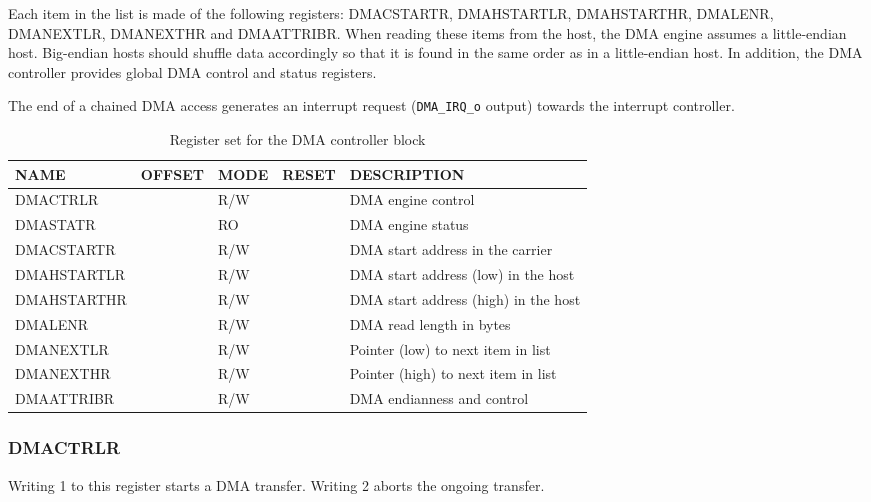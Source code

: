 \documentclass[10pt,a4paper]{cerndoc}
\begin{document}
Each item in the list is made of the following registers: DMACSTARTR, DMAHSTARTLR, DMAHSTARTHR, DMALENR, DMANEXTLR, DMANEXTHR and DMAATTRIBR. When reading these items from the host, the DMA engine assumes a little-endian host. Big-endian hosts should shuffle data accordingly so that it is found in the same order as in a little-endian host. In addition, the DMA controller provides global DMA control and status registers.

The end of a chained DMA access generates an interrupt request (\verb+DMA_IRQ_o+ output) towards the interrupt controller.  

\begin{table}[htbp]
  \centering
  \begin{tabularx}{\textwidth}{|l|r|l|l|X|}                                                     \hline
    \textbf{NAME}  & \textbf{OFFSET} & \textbf{MODE} & \textbf{RESET} & \textbf{DESCRIPTION}  \\ \hline \hline
    DMACTRLR       & & R/W & & DMA engine control                                             \\ \hline
    DMASTATR       & & RO  & & DMA engine status                                              \\ \hline
    DMACSTARTR     & & R/W & & DMA start address in the carrier                               \\ \hline
    DMAHSTARTLR    & & R/W & & DMA start address (low) in the host                            \\ \hline
    DMAHSTARTHR    & & R/W & & DMA start address (high) in the host                           \\ \hline
    DMALENR        & & R/W & & DMA read length in bytes                                       \\ \hline
    DMANEXTLR      & & R/W & & Pointer (low) to next item in list                             \\ \hline
    DMANEXTHR      & & R/W & & Pointer (high) to next item in list                            \\ \hline
    DMAATTRIBR     & & R/W & & DMA endianness and control                                     \\ \hline
  \end{tabularx}
  \caption{Register set for the DMA controller block}
  \label{tab:dma_control}
\end{table}

\subsubsection{DMACTRLR}
Writing 1 to this register starts a DMA transfer. Writing 2 aborts the ongoing transfer.
\end{document}
